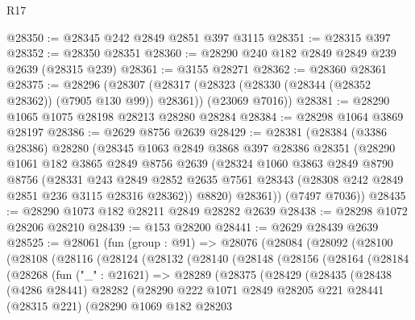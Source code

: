 \begin{lexlean}{R17}
\begin{coremodule}
@28350 := @28345 @242 @2849 @2851 @397 @3115
@28351 := @28315 @397
@28352 := @28350 @28351
@28360 := @28290 @240 @182 @2849 @2849 @239 @2639 (@28315 @239)
@28361 := @3155 @28271
@28362 := @28360 @28361
@28375 := @28296
    (@28307
      (@28317 (@28323 (@28330 (@28344 (@28352 @28362)) (@7905 @130 @99)) @28361))
      (@23069 @7016))
@28381 := @28290 @1065 @1075 @28198 @28213 @28280 @28284
@28384 := @28298 @1064 @3869 @28197
@28386 := @2629 @8756 @2639
@28429 := @28381
    (@28384
      (@3386 @28386)
      @28280
      (@28345
        @1063
        @2849
        @3868
        @397
        @28386
        @28351
        (@28290
          @1061
          @182
          @3865
          @2849
          @8756
          @2639
          (@28324
            @1060
            @3863
            @2849
            @8790
            @8756
            (@28331
              @243
              @2849
              @2852
              @2635
              @7561
              @28343
              (@28308 @242 @2849 @2851 @236 @3115 @28316 @28362))
            @8820)
          @28361))
      (@7497 @7036))
@28435 := @28290 @1073 @182 @28211 @2849 @28282 @2639
@28438 := @28298 @1072 @28206 @28210
@28439 := @153 @28200
@28441 := @2629 @28439 @2639
@28525 := @28061
    (fun (group : @91) =>
    @28076
      (@28084
        (@28092
          (@28100
            (@28108
              (@28116
                (@28124
                  (@28132
                    (@28140
                      (@28148
                        (@28156
                          (@28164
                            (@28184
                              (@28268
                                (fun ("_" : @21621) =>
                                @28289
                                  (@28375
                                    (@28429
                                      (@28435
                                        (@28438
                                          (@4286 @28441)
                                          @28282
                                          (@28290
                                            @222
                                            @1071
                                            @2849
                                            @28205
                                            @221
                                            @28441
                                            (@28315 @221)
                                            (@28290
                                              @1069
                                              @182
                                              @28203

\end{coremodule}
\end{lexlean}
